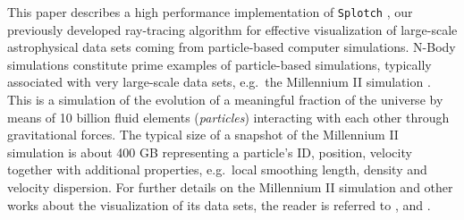 \documentclass[1p,times]{elsarticle}
\begin{document}
%

This paper describes a high performance implementation of 
{\tt Splotch} \citep{2008NJPh...10l5006D}, our previously developed ray-tracing 
algorithm for effective visualization of large-scale astrophysical data sets coming 
from particle-based computer simulations. N-Body simulations constitute 
prime examples of particle-based simulations, typically associated with very 
large-scale data sets, e.g.\ the Millennium II simulation \citep{2009MNRAS.398.1150B}.
This is a simulation of the evolution of a meaningful fraction of the universe 
by means of 10 billion fluid elements ({\it particles}) interacting with each other 
through gravitational forces. The typical size of a snapshot of the Millennium II 
simulation is about 400 GB representing a particle's ID, position, velocity
together with additional properties, e.g.\ local smoothing length, density and 
velocity dispersion. For further details on the Millennium II simulation and
other works about the visualization of its data sets, the reader
is referred to \citep{2009MNRAS.398.1150B}, \cite{fraedrich2009} and \cite{Szalay2008}.
\end{document}
